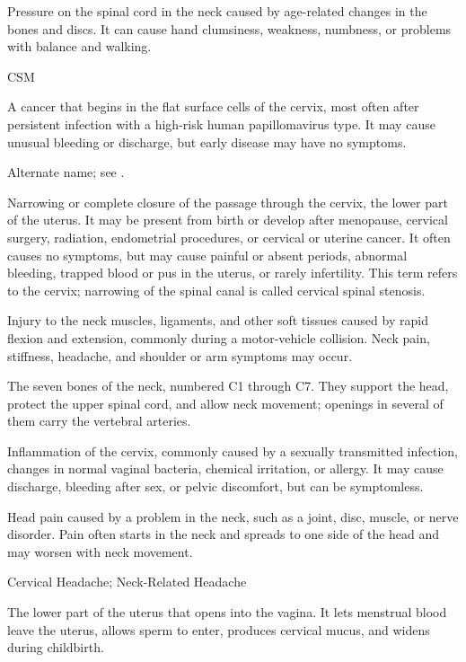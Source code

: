  Pressure on the spinal cord in
the neck caused by age-related changes in the bones and discs. It can cause
hand clumsiness, weakness, numbness, or problems with balance and walking.

\synonyms
CSM

 A cancer that begins in the flat surface cells of the cervix, most often after persistent infection with a high-risk human papillomavirus type. It may cause unusual bleeding or discharge, but early disease may have no symptoms.

 Alternate name; see .

 Narrowing or complete closure of the passage through the cervix, the lower part of the uterus. It may be present from birth or develop after menopause, cervical surgery, radiation, endometrial procedures, or cervical or uterine cancer. It often causes no symptoms, but may cause painful or absent periods, abnormal bleeding, trapped blood or pus in the uterus, or rarely infertility. This term refers to the cervix; narrowing of the spinal canal is called cervical spinal stenosis.

 Injury to the neck muscles, ligaments, and other soft tissues caused by rapid flexion and extension, commonly during a motor-vehicle collision. Neck pain, stiffness, headache, and shoulder or arm symptoms may occur.

 The seven bones of the neck, numbered C1 through C7. They support the head, protect the upper spinal cord, and allow neck movement; openings in several of them carry the vertebral arteries.

 Inflammation of the cervix, commonly caused by a sexually transmitted infection, changes in normal vaginal bacteria, chemical irritation, or allergy. It may cause discharge, bleeding after sex, or pelvic discomfort, but can be symptomless.

 Head pain caused by a problem in the neck, such as a joint, disc, muscle, or nerve disorder. Pain often starts in the neck and spreads to one side of the head and may worsen with neck movement.

\synonyms
Cervical Headache; Neck-Related Headache

 The lower part of the uterus that opens into the vagina. It lets menstrual blood leave the uterus, allows sperm to enter, produces cervical mucus, and widens during childbirth.

